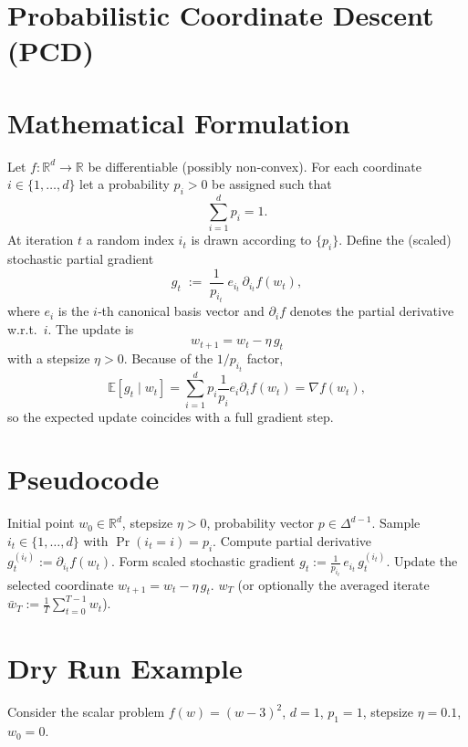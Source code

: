 \documentclass[11pt]{article}
\newcommand{\E}{\mathbb{E}}
\newcommand{\R}{\mathbb{R}}
\newcommand{\grad}{\nabla}
\begin{document}
\section*{Probabilistic Coordinate Descent (PCD)}

\section*{Mathematical Formulation}
Let $f:\R^{d}\rightarrow\R$ be differentiable (possibly non‑convex).  
For each coordinate $i\in\{1,\dots,d\}$ let a probability $p_i>0$ be assigned such that 
\[
\sum_{i=1}^{d}p_i =1 .
\]
At iteration $t$ a random index $i_t$ is drawn according to $\{p_i\}$.  
Define the (scaled) stochastic partial gradient
\[
g_t \;:=\; \frac{1}{p_{i_t}}\;e_{i_t}\,\partial_{i_t}f(w_t),
\]
where $e_i$ is the $i$‑th canonical basis vector and $\partial_i f$ denotes the partial derivative w.r.t.\ $i$.
The update is
\begin{equation}
\boxed{ \; w_{t+1}= w_t - \eta\, g_t \;}
\label{eq:update}
\end{equation}
with a stepsize $\eta>0$.  
Because of the $1/p_{i_t}$ factor,
\[
\E[g_t\mid w_t]=\sum_{i=1}^{d}p_i\frac{1}{p_i}e_i\partial_i f(w_t)=\grad f(w_t),
\]
so the expected update coincides with a full gradient step.

\section*{Pseudocode}
\begin{algorithm}[H]
\caption{Probabilistic Coordinate Descent (PCD)}
\begin{algorithmic}[1]
\Require Initial point $w_0\in\R^{d}$, stepsize $\eta>0$, probability vector $p\in\Delta^{d-1}$.
    \State Sample $i_t\in\{1,\dots,d\}$ with $\Pr(i_t=i)=p_i$.
    \State Compute partial derivative $g^{(i_t)}_t:=\partial_{i_t}f(w_t)$.
    \State Form scaled stochastic gradient 
           $g_t:=\frac{1}{p_{i_t}}\,e_{i_t}\,g^{(i_t)}_t$.
    \State Update the selected coordinate 
           $w_{t+1}= w_t-\eta\,g_t$.
\EndFor
\State \Return $w_T$ (or optionally the averaged iterate $\bar w_T:=\frac1T\sum_{t=0}^{T-1}w_t$).
\end{algorithmic}
\end{algorithm}

\section*{Dry Run Example}
Consider the scalar problem $f(w)=(w-3)^2$, $d=1$, $p_1=1$, stepsize $\eta=0.1$, $w_0=0$.
\end{document}
